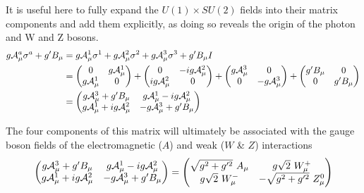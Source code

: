     It is useful here to fully expand the $U(1) \times SU(2)$ fields into their matrix components and add them explicitly,
        as doing so reveals the origin of the photon and W and Z bosons.
    \begin{equation} \begin{split}
        g \mathcal{A}^a_{\mu} \sigma^a + g' B_{\mu} & =
            g \mathcal{A}^1_{\mu} \sigma^1
            + g \mathcal{A}^2_{\mu} \sigma^2
            + g \mathcal{A}^3_{\mu} \sigma^3
            + g' B_{\mu} I \\
        & = \begin{pmatrix}
            0 & g\mathcal{A}^1_{\mu} \\ g\mathcal{A}^1_{\mu} & 0 \end{pmatrix}
            + \begin{pmatrix} 0 & -ig\mathcal{A}^2_{\mu} \\ ig\mathcal{A}^2_{\mu} & 0 \end{pmatrix}
            + \begin{pmatrix} g\mathcal{A}^3_{\mu} & 0 \\ 0 & -g\mathcal{A}^3_{\mu} \end{pmatrix}
            + \begin{pmatrix} g'B_{\mu} & 0 \\ 0 & g'B_{\mu}
        \end{pmatrix} \\
        & = \begin{pmatrix} 
            g\mathcal{A}^3_{\mu} + g'B_{\mu} & g\mathcal{A}^1_{\mu} - ig\mathcal{A}^2_{\mu} \\
            g\mathcal{A}^1_{\mu} + ig\mathcal{A}^2_{\mu} & -g\mathcal{A}^3_{\mu} + g'B_{\mu}
        \end{pmatrix}
    \end{split} \end{equation}

    The four components of this matrix will ultimately be associated with the 
        gauge boson fields of the electromagnetic ($A$) and weak ($W$ \& $Z$) interactions
    \begin{equation} \begin{split}
        \label{eq:electroweak_matrix}
        \begin{pmatrix} 
            g\wField^3_{\mu} + g'B_{\mu} & g\wField^1_{\mu} - ig\wField^2_{\mu} \\
            g\wField^1_{\mu} + ig\wField^2_{\mu} & -g\wField^3_{\mu} + g'B_{\mu}
        \end{pmatrix} =
        \begin{pmatrix} 
            \sqrt{g^2 + g^{\prime 2}}\ A_{\mu} & g \sqrt{2}\ W^+_{\mu} \\
            g \sqrt{2}\ W^-_{\mu} & - \sqrt{g^2 + g^{\prime 2}}\ Z^0_{\mu}
        \end{pmatrix}
    \end{split} \end{equation}

